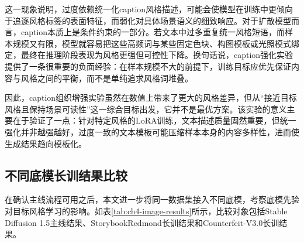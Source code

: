 这一现象说明，过度依赖统一化caption风格描述，可能会使模型在训练中更倾向于追逐风格标签的表面特征，而弱化对具体场景语义的细致响应。对于扩散模型而言，caption本质上是条件约束的一部分。若文本中过多重复统一风格短语，而样本规模又有限，模型就容易把这些高频词与某些固定色块、构图模板或光照模式绑定，最终在推理阶段表现为风格更强但可控性下降。换句话说，caption强化实验提供了一条很重要的负面经验：在样本规模不大的前提下，训练目标应优先保证内容与风格之间的平衡，而不是单纯追求风格词堆叠。

因此，caption组织增强实验虽然在数值上带来了更大的风格差异，但从“接近目标风格且保持场景可读性”这一综合目标出发，它并不是最优方案。该实验的意义主要在于验证了一点：针对特定风格的LoRA训练，文本描述质量固然重要，但统一强化并非越强越好，过度一致的文本模板可能压缩样本本身的内容多样性，进而使生成结果趋向模板化。

\subsection{不同底模长训结果比较}

在确认主线流程可用之后，本文进一步将同一数据集接入不同底模，考察底模先验对目标风格学习的影响。如表\ref{tab:ch4-image-results}所示，比较对象包括Stable Diffusion 1.5主线结果、StorybookRedmond长训结果和Counterfeit-V3.0长训结果。

\begin{table}[htbp]
  \centering
  \caption{各组图像训练结果统计}
  \label{tab:ch4-image-results}
\end{table}

